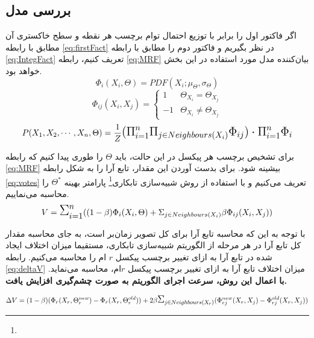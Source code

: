 \documentclass[11.5pt,a4paper]{article}
\begin{document}
\subsection{بررسی مدل}
اگر فاکتور اول را برابر با توزیع احتمال توام برچسب هر نقطه و سطح خاکستری آن مطابق با رابطه
\ref{eq:firstFact}
 در نظر بگیریم و فاکتور دوم را مطابق با رابطه
\ref{eq:IntegFact}
تعریف کنیم، رابطه 
\ref{eq:MRF}
بیان‌کننده مدل مورد استفاده در این بخش خواهد بود.
\begin{equation}
\label{eq:firstFact}
\Phi_{i}(X_i,\Theta) = PDF(X_i;\mu_{\Theta} , \sigma_{\Theta}) 
\end{equation}
\begin{equation}
\label{eq:IntegFact}
\Phi_{ij}(X_i,X_j) = 
	\left\{
		\begin{array}{ll}
			1	&  \Theta_{X_i} = \Theta_{X_j} \\
			-1	&  \Theta_{X_i} \neq \Theta_{X_j}
		\end{array}
	\right.
\end{equation}
\begin{equation}
\label{eq:MRF}
P(X_1, X_2, \cdots, X_n, \Theta) = \frac{1}{Z} \mathlarger{\mathlarger{(\Pi_{i=1}^n\Pi_{j \in Neighbours(X_i)} \Phi_{ij}) \cdot \Pi_{i=1}^n \Phi_i}}
\end{equation}

برای تشخیص برچسب هر پیکسل در این حالت، باید $\Theta$ را طوری پیدا کنیم که رابطه 
\ref{eq:MRF}
بیشینه شود. برای بدست آوردن این مقدار،‌ تابع آرا را به شکل رابطه 
\ref{eq:votes}
تعریف می‌کنیم و با استفاده از روش شبیه‌سازی تابکاری\footnote{}  پارامتر بهینه $\Theta^*$ را محاسبه می‌نماییم. 
\begin{equation}
\label{eq:votes}
V = \mathlarger{\mathlarger{\mathlarger{\Sigma}}}_{i=1}^n ((1-\beta) \Phi_i(X_i,\Theta) + \Sigma_{j \in Neighbours(X_i)} \beta \Phi_{ij}(X_i, X_j))
\end{equation}

با توجه به این که محاسبه تابع آرا برای کل تصویر زمان‌بر است، به جای محاسبه مقدار کل تابع آرا در هر مرحله از الگوریتم شبیه‌سازی تابکاری، مستقیما میزان اختلاف ایجاد شده در تابع آرا به ازای تغییر برچسب پیکسل $r$ ام را محاسبه می‌کنیم. رابطه
\ref{eq:deltaV}
میزان اختلاف تابع آرا به ازای تغییر برچسب پیکسل $r$ام، محاسبه می‌نماید.
\textbf{
 با اعمال این روش، سرعت اجرای الگوریتم به صورت چشم‌گیری افزایش یافت.
}

\begin{equation}
\label{eq:deltaV}
\Delta V = (1-\beta)(\Phi_{r}(X_r, \Theta_r^{new}) - \Phi_{r}(X_r, \Theta_r^{old})) + 2\beta  \mathlarger{\mathlarger{\Sigma}}_{j \in Neighbours(X_r)} (\Phi_{rj}^{new}(X_r,X_j) - \Phi_{rj}^{old}(X_r,X_j))
\end{equation}
\end{document}
